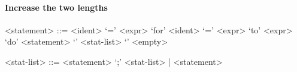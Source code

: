 \paragraph{Increase the two lengths}
\setlength{\grammarparsep}{20pt plus 1pt minus 1pt} %
\setlength{\grammarindent}{12em} %

\begin{grammar}
	
	<statement> ::= <ident> `=' <expr> 
	\alt `for' <ident> `=' <expr> `to' <expr> `do' <statement> 
	\alt `{' <stat-list> `}' 
	\alt <empty> 
	
	<stat-list> ::= <statement> `;' <stat-list> | <statement> 
	
\end{grammar}